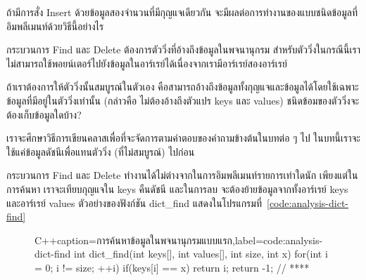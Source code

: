 \begin{quiz}{}
ถ้า{\wbr}มี{\wbr}การ{\wbr}สั่ง Insert ด้วย{\wbr}ข้อมูล{\wbr}สอง{\wbr}จำนวน{\wbr}ที่{\wbr}มี{\wbr}กุญแจ{\wbr}เดียวกัน{\wbr}
จะ{\wbr}มี{\wbr}ผล{\wbr}ต่อ{\wbr}การ{\wbr}ทำงาน{\wbr}ของ{\wbr}แบบ{\wbr}ชนิด{\wbr}ข้อมูล{\wbr}ที่{\wbr}อิม{\wbr}พลี{\wbr}เมนท์{\wbr}ด้วย{\wbr}วิธี{\wbr}นี้{\wbr}อย่างไร{\wbr}
\end{quiz}

กระบวนการ Find และ Delete ต้องการ{\wbr}ตัว{\wbr}วิ่ง{\wbr}ที่{\wbr}อ้าง{\wbr}ถึง{\wbr}ข้อมูล{\wbr}ใน{\wbr}พจนานุกรม{\wbr}
สำหรับ{\wbr}ตัว{\wbr}วิ่ง{\wbr}ใน{\wbr}กรณี{\wbr}นี้{\wbr}เรา{\wbr}ไม่{\wbr}สามารถ{\wbr}ใช้{\wbr}พอยน์เตอร์{\wbr}ไป{\wbr}ยัง{\wbr}ข้อมูล{\wbr}ใน{\wbr}อาร์เรย์{\wbr}ได้{\wbr}เนื่องจาก{\wbr}เรา{\wbr}มี{\wbr}อาร์เรย์{\wbr}สอง{\wbr}อาร์เรย์

\begin{quiz}{}
ถ้า{\wbr}เรา{\wbr}ต้องการ{\wbr}ให้{\wbr}ตัว{\wbr}วิ่ง{\wbr}นั้น{\wbr}สมบูรณ์{\wbr}ใน{\wbr}ตัวเอง{\wbr}
คือ{\wbr}สามารถ{\wbr}อ้าง{\wbr}ถึง{\wbr}ข้อมูล{\wbr}ทั้ง{\wbr}กุญแจ{\wbr}และ{\wbr}ข้อมูล{\wbr}ได้{\wbr}โดย{\wbr}ใช้{\wbr}เฉพาะ{\wbr}ข้อมูล{\wbr}ที่{\wbr}มี{\wbr}อยู่{\wbr}ใน{\wbr}ตัว{\wbr}วิ่ง{\wbr}เท่านั้น (กล่าวคือ{\wbr}
ไม่{\wbr}ต้อง{\wbr}อ้าง{\wbr}ถึง{\wbr}ตัวแปร {\ct keys} และ {\ct values})
ชนิด{\wbr}ข้อ{\wbr}ม{\wbr}ของ{\wbr}ตัว{\wbr}วิ่ง{\wbr}จะ{\wbr}ต้อง{\wbr}เก็บ{\wbr}ข้อมูล{\wbr}ใด{\wbr}บ้าง?
\end{quiz}

เรา{\wbr}จะ{\wbr}ศึกษา{\wbr}วิธีการ{\wbr}เขียน{\wbr}ค{\wbr}ลา{\wbr}ส{\wbr}เพื่อที่จะ{\wbr}จัดการ{\wbr}ตาม{\wbr}คำตอบ{\wbr}ของ{\wbr}คำถาม{\wbr}ข้างต้น{\wbr}ใน{\wbr}บท{\wbr}ต่อ ๆ ไป{\wbr}
ใน{\wbr}บท{\wbr}นี้{\wbr}เรา{\wbr}จะ{\wbr}ใช้{\wbr}แค่{\wbr}ข้อมูล{\wbr}ดัชนี{\wbr}เพื่อ{\wbr}แทน{\wbr}ตัว{\wbr}วิ่ง (ที่{\wbr}ไม่{\wbr}สมบูรณ์) ไป{\wbr}ก่อน{\wbr}

กระบวนการ Find และ Delete ทำงาน{\wbr}ได้{\wbr}ไม่{\wbr}ต่าง{\wbr}จาก{\wbr}ใน{\wbr}การ{\wbr}อิม{\wbr}พลี{\wbr}เมนท์{\wbr}รายการ{\wbr}เท่าใด{\wbr}นัก{\wbr}
เพียงแต่{\wbr}ใน{\wbr}การ{\wbr}ค้นหา เรา{\wbr}จะ{\wbr}เทียบ{\wbr}กุญแจ{\wbr}ใน {\ct keys} คืน{\wbr}ดัชนี และ{\wbr}ใน{\wbr}การ{\wbr}ลบ{\wbr}
จะ{\wbr}ต้อง{\wbr}ย้าย{\wbr}ข้อมูล{\wbr}จาก{\wbr}ทั้ง{\wbr}อาร์เรย์ {\ct keys} และ{\wbr}อาร์เรย์ {\ct values}
ตัวอย่าง{\wbr}ของ{\wbr}ฟังก์ชัน {\ct dict\_find }
แสดง{\wbr}ใน{\wbr}โปรแกรม{\wbr}ที่~\ref{code:analysis-dict-find}

\begin{figure}
\latintext
\begin{codelist}{C++}{caption={\thaitext การ{\wbr}ค้นหา{\wbr}ข้อมูล{\wbr}ใน{\wbr}พจนานุกรม{\wbr}แบบ{\wbr}แรก\latintext},label=code:analysis-dict-find}
int dict_find(int keys[], int values[], int size, int x)
{
  for(int i = 0; i != size; ++i)
    if(keys[i] == x)
      return i;
  return -1;                // ****
}
\end{codelist}
\thaitext
\end{figure}

